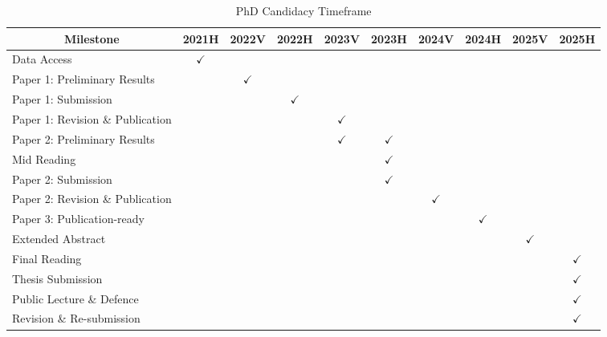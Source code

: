 \documentclass[12pt,a4paper,stu]{apa7}
\begin{document}
\newpage

\begin{sidewaystable}[htbp]
    \begin{threeparttable}
    \caption{PhD Candidacy Timeframe}
    \label{tab:timeframe}
        \begin{tabular}{lccccccccc}
        \toprule
        \multicolumn{1}{c}{Milestone} & 2021H & 2022V & 2022H & 2023V & 2023H & 2024V & 2024H & 2025V & 2025H \\
        \midrule
        Data Access & $\checkmark$     &       &       &       &       &       &       &       &  \\
        Paper 1: Preliminary Results &       & $\checkmark$     &       &       &       &       &       &       &  \\
        Paper 1: Submission &       &       & $\checkmark$     &       &       &       &       &       &  \\
        Paper 1: Revision \& Publication &       &       &       & $\checkmark$     &       &       &       &       &  \\
        Paper 2: Preliminary Results &       &       &       & $\checkmark$     & $\checkmark$     &       &       &       &  \\
        Mid Reading &       &       &       &       & $\checkmark$     &       &       &       &  \\
        Paper 2: Submission &       &       &       &       & $\checkmark$     &       &       &       &  \\
        Paper 2: Revision \& Publication &       &       &       &       &       & $\checkmark$     &       &       &  \\
        Paper 3: Publication-ready &       &       &       &       &       &       & $\checkmark$     &       &  \\
        Extended Abstract &       &       &       &       &       &       &       & $\checkmark$     &  \\
        Final Reading &       &       &       &       &       &       &       &       & $\checkmark$ \\
        Thesis Submission &       &       &       &       &       &       &       &       & $\checkmark$ \\
        Public Lecture \& Defence &       &       &       &       &       &       &       &       & $\checkmark$ \\
        Revision \& Re-submission &       &       &       &       &       &       &       &       & $\checkmark$ \\
        \bottomrule
        \end{tabular}
    \end{threeparttable}
\end{sidewaystable}
\end{document}

